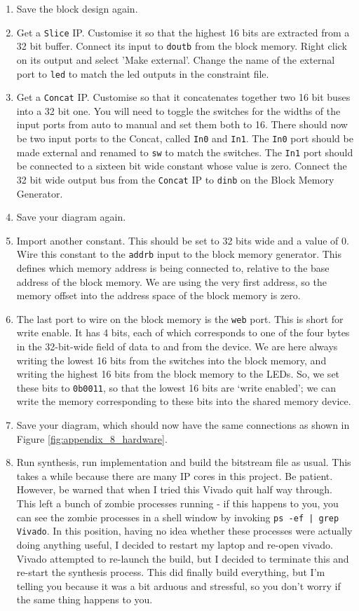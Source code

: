 \documentclass[../physical_computing.tex]{subfiles}
\begin{document}
\begin{enumerate}
    \item Save the block design again.
    \item Get a \texttt{Slice} IP. Customise it so that the highest 16 bits are extracted from a 32 bit buffer. Connect its input to \texttt{doutb} from the block memory. Right click on its output and select 'Make external'. Change the name of the external port to \texttt{led} to match the led outputs in the constraint file.
    \item Get a \texttt{Concat} IP. Customise so that it concatenates together two 16 bit buses into a 32 bit one. You will need to toggle the switches for the widths of the input ports from auto to manual and set them both to 16. There should now be two input ports to the Concat, called \texttt{In0} and \texttt{In1}. The \texttt{In0} port should be made external and renamed to \texttt{sw} to match the switches. The \texttt{In1} port should be connected to a sixteen bit wide constant whose value is zero. Connect the 32 bit wide output bus from the \texttt{Concat} IP to \texttt{dinb} on the Block Memory Generator.
    \item Save your diagram again.
    \item Import another constant. This should be set to 32 bits wide and a value of 0. Wire this constant to the \texttt{addrb} input to the block memory generator. This defines which memory address is being connected to, relative to the base address of the block memory. We are using the very first address, so the memory offset into the address space of the block memory is zero.
    \item The last port to wire on the block memory is the \texttt{web} port. This is short for write enable. It has 4 bits, each of which corresponds to one of the four bytes in the 32-bit-wide field of data to and from the device. We are here always writing the lowest 16 bits from the switches into the block memory, and writing the highest 16 bits from the block memory to the LEDs. So, we set these bits to \texttt{0b0011}, so that the lowest 16 bits are `write enabled'; we can write the memory corresponding to these bits into the shared memory device.
    \item Save your diagram, which should now have the same connections as shown in Figure \ref{fig:appendix_8_hardware}.
    \item Run synthesis, run implementation and build the bitstream file as usual. This takes a while because there are many IP cores in this project. Be patient. However, be warned that when I tried this Vivado quit half way through. This left a bunch of zombie processes running - if this happens to you, you can see the zombie processes in a shell window by invoking \texttt{ps -ef | grep Vivado}. In this position, having no idea whether these processes were actually doing anything useful, I decided to restart my laptop and re-open vivado. Vivado attempted to re-launch the build, but I decided to terminate this and re-start the synthesis process. This did finally build everything, but I'm telling you because it was a bit arduous and stressful, so you don't worry if the same thing happens to you.

\end{enumerate}
\end{document}
